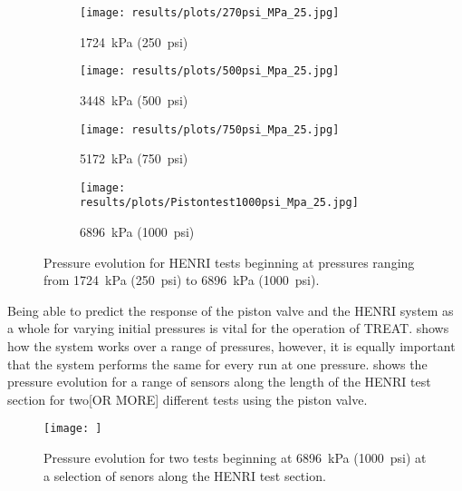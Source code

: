 \begin{figure}[htbp]
    \vspace{16pt}
    \centering
    \begin{subfigure}{0.49\textwidth}
        \texttt{[image: results/plots/270psi\_MPa\_25.jpg]}
        \caption{\SI{1724}{\kilo\pascal} (\SI{250}{psi})}
        \label{fig:piston multi 250}
    \end{subfigure}
    \hfill
    \begin{subfigure}{0.49\textwidth}
        \texttt{[image: results/plots/500psi\_Mpa\_25.jpg]}
        \caption{\SI{3448}{\kilo\pascal} (\SI{500}{psi})}
        \label{fig:piston multi 500}
    \end{subfigure}
    
    \begin{subfigure}{0.49\textwidth}
        \texttt{[image: results/plots/750psi\_Mpa\_25.jpg]}
        \caption{\SI{5172}{\kilo\pascal} (\SI{750}{psi})}
        \label{fig:piston multi 750}
    \end{subfigure}
    \hfill
    \begin{subfigure}{0.49\textwidth}
        \texttt{[image: results/plots/Pistontest1000psi\_Mpa\_25.jpg]}
        \caption{\SI{6896}{\kilo\pascal} (\SI{1000}{psi})}
        \label{fig:piston multi 1000}
    \end{subfigure}

    \caption{Pressure evolution for HENRI tests beginning at pressures ranging from \SI{1724}{\kilo\pascal} (\SI{250}{psi}) to \SI{6896}{\kilo\pascal} (\SI{1000}{psi}).}
    \label{fig:piston multi}
    \vspace{16pt}
\end{figure}

Being able to predict the response of the piston valve and the HENRI system as a whole for varying initial pressures is vital for the operation of TREAT.  shows how the system works over a range of pressures, however, it is equally important that the system performs the same for every run at one pressure.  shows the pressure evolution for a range of sensors along the length of the HENRI test section for two[OR MORE] different tests using the piston valve.


\begin{figure}[htbp]
    \vspace{16pt}
    \centering
    \texttt{[image: ]}
    \caption{Pressure evolution for two tests beginning at \SI{6896}{\kilo\pascal} (\SI{1000}{psi}) at a selection of senors along the HENRI test section.}
    \label{fig:piston rel}
    \vspace{16pt}
\end{figure}

